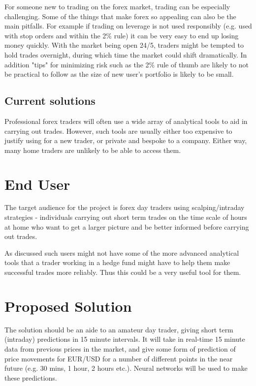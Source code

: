     For someone new to trading on the forex market, trading can be especially challenging. Some of the things that make forex so appealing can also be the main pitfalls. For example if trading on leverage is not used responsibly (e.g. used with stop orders and within the 2\% rule) it can be very easy to end up losing money quickly. With the market being open 24/5, traders might be tempted to hold trades overnight, during which time the market could shift dramatically. In addition "tips" for minimizing risk such as the 2\% rule of thumb are likely to not be practical to follow as the size of new user's portfolio is likely to be small. 

        \subsection{Current solutions}
        Professional forex traders will often use a wide array of analytical tools to aid in carrying out trades. However, such tools are usually either too expensive to justify using for a new trader, or private and bespoke to a company. Either way, many home traders are unlikely to be able to access them.


    \section{End User}
    The target audience for the project is forex day traders using scalping/intraday strategies -  individuals carrying out short term trades on the time scale of hours at home who want to get a larger picture and be better informed before carrying out trades. 

    As discussed such users might not have some of the more advanced analytical tools that a trader working in a hedge fund might have to help them make successful trades more reliably. Thus this could be a very useful tool for them.


    \section{Proposed Solution}

    The solution should be an aide to an amateur day trader, giving short term (intraday) predictions in 15 minute intervals. It will take in real-time 15 minute data from previous prices in the market, and give some form of prediction of price movements for EUR/USD for a number of different points in the near future (e.g. 30 mins, 1 hour, 2 hours etc.). Neural networks will be used to make these predictions.

